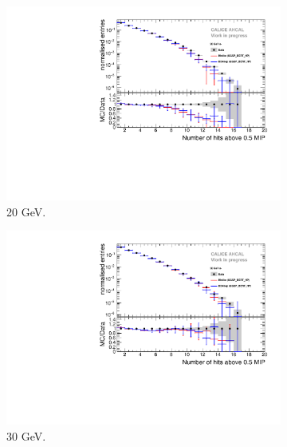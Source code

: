\begin{figure}[htbp!]
\begin{subfigure}[t]{0.5\textwidth}
		\includegraphics[width=1\textwidth]{../Thesis_Plots/Timing/Electrons/Plots/Comparison_SimData_Electrons_nHits_20GeV.pdf}
		\caption{20 GeV.}\label{fig:elec_sim_data_nHits_20GeV}
	\end{subfigure}
	\hfill
	\begin{subfigure}[t]{0.5\textwidth}
		\centering
		\includegraphics[width=1\textwidth]{../Thesis_Plots/Timing/Electrons/Plots/Comparison_SimData_Electrons_nHits_30GeV.pdf}
		\caption{30 GeV.}\label{fig:elec_sim_data_nHits_30GeV}
	\end{subfigure}
	\hfill
	\begin{subfigure}[t]{0.5\textwidth}
		\centering

\end{subfigure}
\end{figure}
